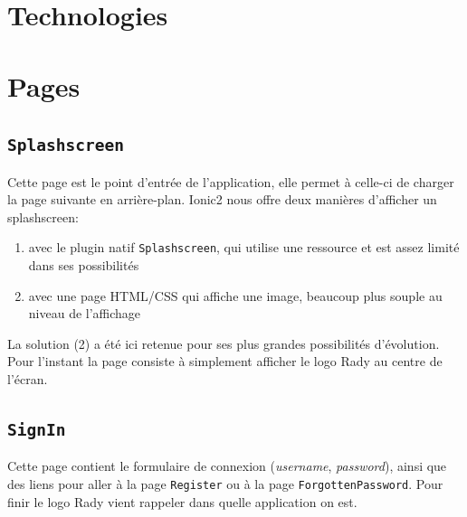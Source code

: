\documentclass[french]{article}
\begin{document}
	\section{Technologies}
		
	\section{Pages}
		
		\subsection{\texttt{Splashscreen}}
			Cette page est le point d'entrée de l'application, elle permet à celle-ci de charger la page suivante en arrière-plan. Ionic2 nous offre deux manières d'afficher un splashscreen:
			\begin{enumerate}
				\item avec le plugin natif \texttt{Splashscreen}, qui utilise une ressource et est assez limité dans ses possibilités
				\item avec une page HTML/CSS qui affiche une image, beaucoup plus souple au niveau de l'affichage
			\end{enumerate}
			La solution (2) a été ici retenue pour ses plus grandes possibilités d'évolution.\\
			
			Pour l'instant la page consiste à simplement afficher le logo Rady au centre de l'écran.
			
		\subsection{\texttt{SignIn}}
			Cette page contient le formulaire de connexion (\textit{username}, \textit{password}), ainsi que des liens pour aller à la page \texttt{Register} ou à la page \texttt{ForgottenPassword}. Pour finir le logo Rady vient rappeler dans quelle application on est.
		
			
\end{document}
